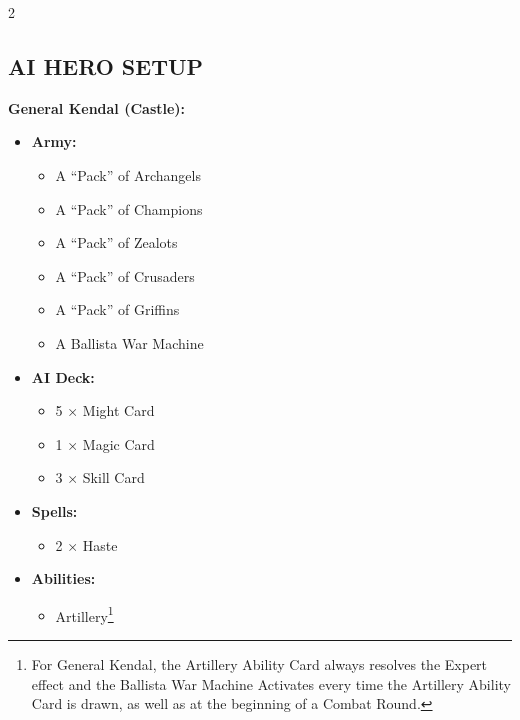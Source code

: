\begin{multicols*}{2}
\subsection*{\MakeUppercase{AI Hero Setup}}

\textbf{General Kendal (Castle):}
\begin{itemize}
    \item \textbf{Army:}
    \begin{itemize}
        \item A ``Pack'' of Archangels
        \item A ``Pack'' of Champions
        \item A ``Pack'' of Zealots
        \item A ``Pack'' of Crusaders
        \item A ``Pack'' of Griffins
        \item A Ballista War Machine
    \end{itemize}
    \item \textbf{AI Deck:}
    \begin{itemize}
        \item 5 × Might  Card
        \item 1 × Magic  Card
        \item 3 × Skill  Card
    \end{itemize}
    \item \textbf{Spells:}
    \begin{itemize}
        \item 2 × Haste
    \end{itemize}
    \item \textbf{Abilities:}
    \begin{itemize}
        \item Artillery\footnote{For General Kendal, the Artillery Ability Card always resolves the Expert effect and the Ballista War Machine Activates every time the Artillery Ability Card is drawn, as well as at the beginning of a Combat Round.}
    \end{itemize}
\end{itemize}


\end{multicols*}
